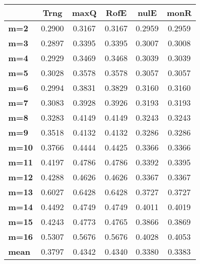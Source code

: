 \begin{tabular}{|l|c|c|c|c|c|}
\hline
&\textbf{Trng}&\textbf{maxQ}&\textbf{RofE}&\textbf{nulE}&\textbf{monR}\\\hline
\textbf{m=2}&0.2900&0.3167&0.3167&0.2959&0.2959\\\hline
\textbf{m=3}&0.2897&0.3395&0.3395&0.3007&0.3008\\\hline
\textbf{m=4}&0.2929&0.3469&0.3468&0.3039&0.3039\\\hline
\textbf{m=5}&0.3028&0.3578&0.3578&0.3057&0.3057\\\hline
\textbf{m=6}&0.2994&0.3831&0.3829&0.3160&0.3160\\\hline
\textbf{m=7}&0.3083&0.3928&0.3926&0.3193&0.3193\\\hline
\textbf{m=8}&0.3283&0.4149&0.4149&0.3243&0.3243\\\hline
\textbf{m=9}&0.3518&0.4132&0.4132&0.3286&0.3286\\\hline
\textbf{m=10}&0.3766&0.4444&0.4425&0.3366&0.3366\\\hline
\textbf{m=11}&0.4197&0.4786&0.4786&0.3392&0.3395\\\hline
\textbf{m=12}&0.4288&0.4626&0.4626&0.3367&0.3367\\\hline
\textbf{m=13}&0.6027&0.6428&0.6428&0.3727&0.3727\\\hline
\textbf{m=14}&0.4492&0.4749&0.4749&0.4011&0.4019\\\hline
\textbf{m=15}&0.4243&0.4773&0.4765&0.3866&0.3869\\\hline
\textbf{m=16}&0.5307&0.5676&0.5676&0.4028&0.4053\\\hline
\textbf{mean}&0.3797&0.4342&0.4340&0.3380&0.3383\\\hline
\end{tabular}
